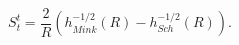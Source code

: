\begin{equation}
S_t^t=\frac{2}{R}\left(h_{Mink}^{-1/2}(R)-h_{Sch}^{-1/2}(R)\right). 
\label{eq:Stt}\end{equation}

